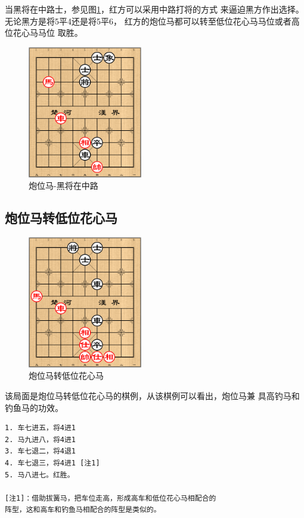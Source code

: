\documentclass[a5paper,twoside]{book}
\begin{document}
当黑将在中路士，参见图\ref{pwm-hjzzl}，红方可以采用中路打将的方式
来逼迫黑方作出选择。无论黑方是将5平4还是将5平6，
红方的炮位马都可以转至低位花心马马位或者高位花心马马位
取胜。

\begin{figure}[H]
\centering
\includegraphics[width=5cm]{pic/炮位马-黑将在中路.png}
\caption{\label{pwm-hjzzl}炮位马-黑将在中路}
\end{figure}


\subsection{炮位马转低位花心马}
\label{sec-5-1-2}
\begin{figure}[H]
\centering
\includegraphics[width=5cm]{pic/炮位马转低位花心马.png}
\caption{炮位马转低位花心马}
\end{figure}

该局面是炮位马转低位花心马的棋例，从该棋例可以看出，炮位马兼
具高钓马和钓鱼马的功效。

\begin{verbatim}
1. 车七进五，将4进1
2. 马九进八，将4进1
3. 车七退二，将4退1
4. 车七退三，将4进1 [注1]
5. 马八进七。红胜。

[注1]：借助拔簧马，把车位走高，形成高车和低位花心马相配合的
阵型，这和高车和钓鱼马相配合的阵型是类似的。
\end{verbatim}
\end{document}
